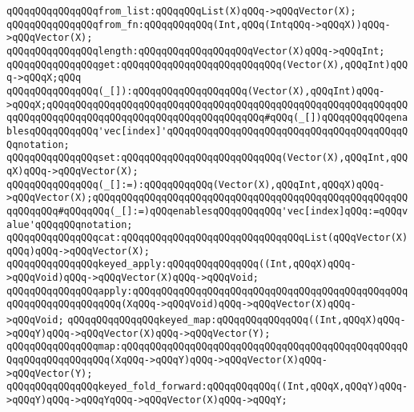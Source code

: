 \newline
\verb|qQQqqQQqqQQqqQQqfrom_list:qQQqqQQqList(X)qQQq->qQQqVector(X);|\newline
\verb|qQQqqQQqqQQqqQQqfrom_fn:qQQqqQQqqQQq(Int,qQQq(IntqQQq->qQQqX))qQQq->qQQqVector(X);|\newline
\newline
\verb|qQQqqQQqqQQqqQQqlength:qQQqqQQqqQQqqQQqqQQqVector(X)qQQq->qQQqInt;|\newline
\newline
\verb|qQQqqQQqqQQqqQQqget:qQQqqQQqqQQqqQQqqQQqqQQqqQQq(Vector(X),qQQqInt)qQQq->qQQqX;qQQq|\newline
\verb|qQQqqQQqqQQqqQQq(_[]):qQQqqQQqqQQqqQQqqQQq(Vector(X),qQQqInt)qQQq->qQQqX;qQQqqQQqqQQqqQQqqQQqqQQqqQQqqQQqqQQqqQQqqQQqqQQqqQQqqQQqqQQqqQQqqQQqqQQqqQQqqQQqqQQqqQQqqQQqqQQqqQQqqQQqqQQq#qQQq(_[])qQQqqQQqqQQqenablesqQQqqQQqqQQq'vec[index]'qQQqqQQqqQQqqQQqqQQqqQQqqQQqqQQqqQQqqQQqqQQqnotation;|\newline
\newline
\verb|qQQqqQQqqQQqqQQqset:qQQqqQQqqQQqqQQqqQQqqQQqqQQq(Vector(X),qQQqInt,qQQqX)qQQq->qQQqVector(X);|\newline
\verb|qQQqqQQqqQQqqQQq(_[]:=):qQQqqQQqqQQq(Vector(X),qQQqInt,qQQqX)qQQq->qQQqVector(X);qQQqqQQqqQQqqQQqqQQqqQQqqQQqqQQqqQQqqQQqqQQqqQQqqQQqqQQqqQQqqQQq#qQQqqQQq(_[]:=)qQQqenablesqQQqqQQqqQQq'vec[index]qQQq:=qQQqvalue'qQQqqQQqnotation;|\newline
\newline
\verb|qQQqqQQqqQQqqQQqcat:qQQqqQQqqQQqqQQqqQQqqQQqqQQqqQQqList(qQQqVector(X)qQQq)qQQq->qQQqVector(X);|\newline
\newline
\verb|qQQqqQQqqQQqqQQqkeyed_apply:qQQqqQQqqQQqqQQq((Int,qQQqX)qQQq->qQQqVoid)qQQq->qQQqVector(X)qQQq->qQQqVoid;|\newline
\verb|qQQqqQQqqQQqqQQqapply:qQQqqQQqqQQqqQQqqQQqqQQqqQQqqQQqqQQqqQQqqQQqqQQqqQQqqQQqqQQqqQQqqQQq(XqQQq->qQQqVoid)qQQq->qQQqVector(X)qQQq->qQQqVoid;|\newline
\newline
\verb|qQQqqQQqqQQqqQQqkeyed_map:qQQqqQQqqQQqqQQq((Int,qQQqX)qQQq->qQQqY)qQQq->qQQqVector(X)qQQq->qQQqVector(Y);|\newline
\verb|qQQqqQQqqQQqqQQqmap:qQQqqQQqqQQqqQQqqQQqqQQqqQQqqQQqqQQqqQQqqQQqqQQqqQQqqQQqqQQqqQQqqQQq(XqQQq->qQQqY)qQQq->qQQqVector(X)qQQq->qQQqVector(Y);|\newline
\newline
\verb|qQQqqQQqqQQqqQQqkeyed_fold_forward:qQQqqQQqqQQq((Int,qQQqX,qQQqY)qQQq->qQQqY)qQQq->qQQqYqQQq->qQQqVector(X)qQQq->qQQqY;|\newline
